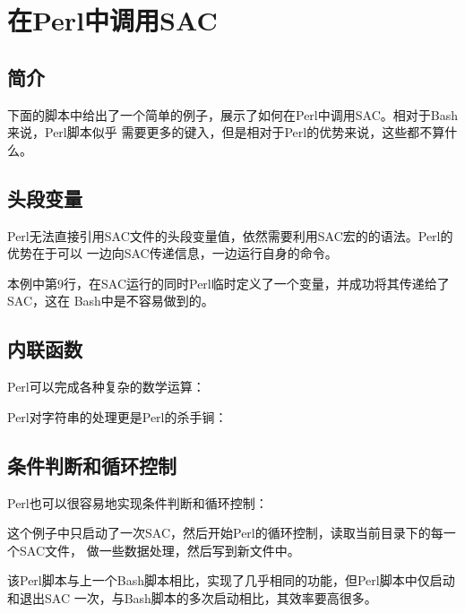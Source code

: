 \section{在Perl中调用SAC}
\label{sec:sac-perl}

\subsection{简介}
下面的脚本中给出了一个简单的例子，展示了如何在Perl中调用SAC。相对于Bash来说，Perl脚本似乎
需要更多的键入，但是相对于Perl的优势来说，这些都不算什么。


\subsection{头段变量}
Perl无法直接引用SAC文件的头段变量值，依然需要利用SAC宏的的语法。Perl的优势在于可以
一边向SAC传递信息，一边运行自身的命令。

本例中第9行，在SAC运行的同时Perl临时定义了一个变量，并成功将其传递给了SAC，这在
Bash中是不容易做到的。

\subsection{内联函数}
Perl可以完成各种复杂的数学运算：


Perl对字符串的处理更是Perl的杀手锏：


\subsection{条件判断和循环控制}
Perl也可以很容易地实现条件判断和循环控制：

这个例子中只启动了一次SAC，然后开始Perl的循环控制，读取当前目录下的每一个SAC文件，
做一些数据处理，然后写到新文件中。

该Perl脚本与上一个Bash脚本相比，实现了几乎相同的功能，但Perl脚本中仅启动和退出SAC
一次，与Bash脚本的多次启动相比，其效率要高很多。
